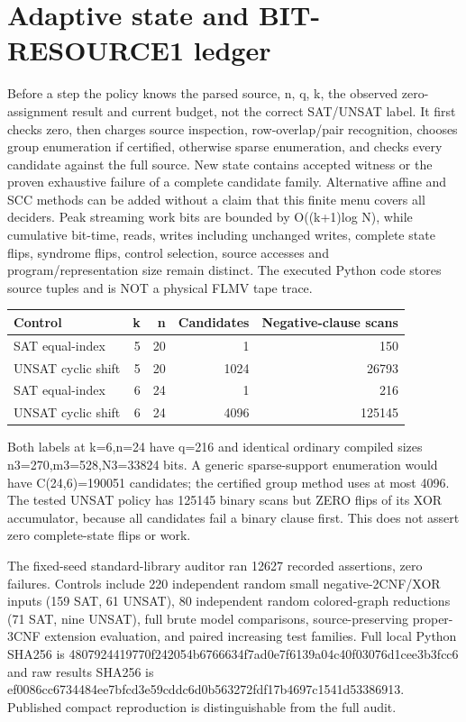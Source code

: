 \documentclass[11pt]{article}
\begin{document}
\section{Adaptive state and BIT-RESOURCE1 ledger}
Before a step the policy knows the parsed source, n, q, k, the observed zero-assignment result and current budget, not the correct SAT/UNSAT label. It first checks zero, then charges source inspection, row-overlap/pair recognition, chooses group enumeration if certified, otherwise sparse enumeration, and checks every candidate against the full source. New state contains accepted witness or the proven exhaustive failure of a complete candidate family. Alternative affine and SCC methods can be added without a claim that this finite menu covers all deciders. Peak streaming work bits are bounded by O((k+1)log N), while cumulative bit-time, reads, writes including unchanged writes, complete state flips, syndrome flips, control selection, source accesses and program/representation size remain distinct. The executed Python code stores source tuples and is NOT a physical FLMV tape trace.

\begin{center}\begin{tabular}{lrrrr}\toprule
Control&k&n&Candidates&Negative-clause scans\\\midrule
SAT equal-index&5&20&1&150\\
UNSAT cyclic shift&5&20&1024&26793\\
SAT equal-index&6&24&1&216\\
UNSAT cyclic shift&6&24&4096&125145\\\bottomrule
\end{tabular}\end{center}
Both labels at k=6,n=24 have q=216 and identical ordinary compiled sizes n3=270,m3=528,N3=33824 bits. A generic sparse-support enumeration would have C(24,6)=190051 candidates; the certified group method uses at most 4096. The tested UNSAT policy has 125145 binary scans but ZERO flips of its XOR accumulator, because all candidates fail a binary clause first. This does not assert zero complete-state flips or work.

The fixed-seed standard-library auditor ran 12627 recorded assertions, zero failures. Controls include 220 independent random small negative-2CNF/XOR inputs (159 SAT, 61 UNSAT), 80 independent random colored-graph reductions (71 SAT, nine UNSAT), full brute model comparisons, source-preserving proper-3CNF extension evaluation, and paired increasing test families. Full local Python SHA256 is 4807924419770f242054b6766634f7ad0e7f6139a04c40f03076d1cee3b3fcc6 and raw results SHA256 is ef0086cc6734484ee7bfcd3e59cddc6d0b563272fdf17b4697c1541d53386913. Published compact reproduction is distinguishable from the full audit.
\end{document}
